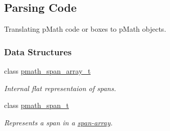 \hypertarget{group__parser}{
\subsection{Parsing Code}
\label{group__parser}
}
Translating pMath code or boxes to pMath objects.  


\subsubsection*{Data Structures}
\begin{CompactItemize}
\item 
class \hyperlink{classpmath__span__array__t}{pmath\_\-span\_\-array\_\-t}
\begin{CompactList}\small\item\em Internal flat representaion of spans. \item\end{CompactList}\item 
class \hyperlink{classpmath__span__t}{pmath\_\-span\_\-t}
\begin{CompactList}\small\item\em Represents a span in a \hyperlink{classpmath__span__array__t}{span-array}. \item\end{CompactList}\end{CompactItemize}
